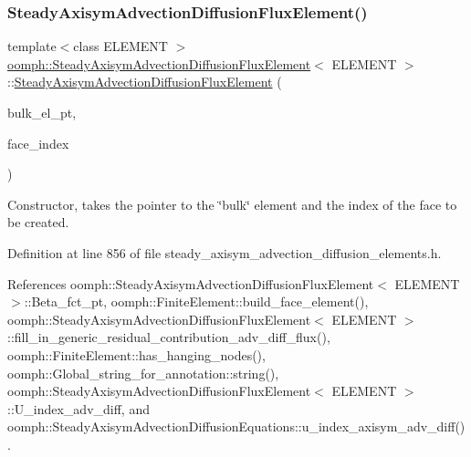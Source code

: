 \subsubsection{\texorpdfstring{Steady\+Axisym\+Advection\+Diffusion\+Flux\+Element()}{SteadyAxisymAdvectionDiffusionFluxElement()}\hspace{0.1cm}{\footnotesize\ttfamily [1/3]}}
{\footnotesize\ttfamily template$<$class E\+L\+E\+M\+E\+NT $>$ \\
\hyperlink{classoomph_1_1SteadyAxisymAdvectionDiffusionFluxElement}{oomph\+::\+Steady\+Axisym\+Advection\+Diffusion\+Flux\+Element}$<$ E\+L\+E\+M\+E\+NT $>$\+::\hyperlink{classoomph_1_1SteadyAxisymAdvectionDiffusionFluxElement}{Steady\+Axisym\+Advection\+Diffusion\+Flux\+Element} (\begin{DoxyParamCaption}\item[{\hyperlink{classoomph_1_1FiniteElement}{Finite\+Element} $\ast$const \&}]{bulk\+\_\+el\+\_\+pt,  }\item[{const int \&}]{face\+\_\+index }\end{DoxyParamCaption})}



Constructor, takes the pointer to the \char`\"{}bulk\char`\"{} element and the index of the face to be created. 



Definition at line 856 of file steady\+\_\+axisym\+\_\+advection\+\_\+diffusion\+\_\+elements.\+h.



References oomph\+::\+Steady\+Axisym\+Advection\+Diffusion\+Flux\+Element$<$ E\+L\+E\+M\+E\+N\+T $>$\+::\+Beta\+\_\+fct\+\_\+pt, oomph\+::\+Finite\+Element\+::build\+\_\+face\+\_\+element(), oomph\+::\+Steady\+Axisym\+Advection\+Diffusion\+Flux\+Element$<$ E\+L\+E\+M\+E\+N\+T $>$\+::fill\+\_\+in\+\_\+generic\+\_\+residual\+\_\+contribution\+\_\+adv\+\_\+diff\+\_\+flux(), oomph\+::\+Finite\+Element\+::has\+\_\+hanging\+\_\+nodes(), oomph\+::\+Global\+\_\+string\+\_\+for\+\_\+annotation\+::string(), oomph\+::\+Steady\+Axisym\+Advection\+Diffusion\+Flux\+Element$<$ E\+L\+E\+M\+E\+N\+T $>$\+::\+U\+\_\+index\+\_\+adv\+\_\+diff, and oomph\+::\+Steady\+Axisym\+Advection\+Diffusion\+Equations\+::u\+\_\+index\+\_\+axisym\+\_\+adv\+\_\+diff().

\mbox{\label{classoomph_1_1SteadyAxisymAdvectionDiffusionFluxElement_a5bc0b6dd3ea00a4eb9d88bc0cba1b9cd}} 
